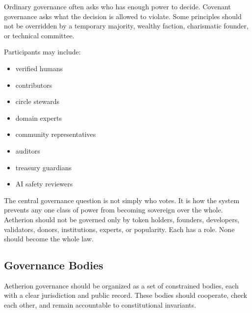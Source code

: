 \documentclass[12pt]{article}
\begin{document}
Ordinary governance often asks who has enough power to decide. Covenant governance asks what the decision is allowed to violate. Some principles should not be overridden by a temporary majority, wealthy faction, charismatic founder, or technical committee.

Participants may include:

\begin{itemize}
  \item verified humans
  \item contributors
  \item circle stewards
  \item domain experts
  \item community representatives
  \item auditors
  \item treasury guardians
  \item AI safety reviewers
\end{itemize}

The central governance question is not simply who votes. It is how the system prevents any one class of power from becoming sovereign over the whole. Aetherion should not be governed only by token holders, founders, developers, validators, donors, institutions, experts, or popularity. Each has a role. None should become the whole law.


\subsection{Governance Bodies}

Aetherion governance should be organized as a set of constrained bodies, each with a clear jurisdiction and public record. These bodies should cooperate, check each other, and remain accountable to constitutional invariants.
\end{document}
